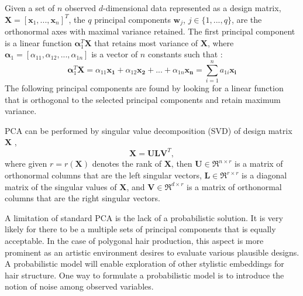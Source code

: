 \documentclass[ %
author={Dillon Keith Diep},
supervisor={Dr. Carl Henrik Ek},
degree={MEng},
title={ART-CG:},
subtitle={Assisted Real-time Content Generation of 3D Hair by Learning Manifolds},
type={Research},
year={2017} ]{dissertation}
\begin{document}
Given a set of $n$ observed $d$-dimensional data represented as a design matrix, $\bm{X}=[\bm{x}_1,...,\bm{x}_n]^T$, the $q$ principal components $\bm{w}_j$, $j \in \{1,...,q\}$, are the orthonormal axes with maximal variance retained. The first principal component is a linear function $\bm{\alpha}^T_1\bm{X}$ that retains most variance of $\bm{X}$, where $\bm{\alpha}_1 = [\alpha_{11}, \alpha_{12}, ..., \alpha_{1n}]$ is a vector of $n$ constants such that \cite[p.4]{pca2002}:
$$\bm{\alpha}^T_1\bm{X}=\alpha_{11}\bm{x_1}+\alpha_{12}\bm{x_2}+...+\alpha_{1n}\bm{x_n} = \sum^n_{i=1}a_{1i}\bm{x_i}$$
The following principal components are found by looking for a linear function that is orthogonal to the selected principal components and retain maximum variance.

PCA can be performed by singular value decomposition (SVD) of design matrix $\bm{X}$ \cite[pp.44-46]{pca2002},
$$\bm{X=ULV}^T,$$
where given $r = r(\bm{X})$ denotes the rank of $\bm{X}$, then
$\bm{U} \in \Re^{n \times r}$ is a matrix of orthonormal columns that are the left singular vectors,
$\bm{L} \in \Re^{r \times r}$ is a diagonal matrix of the singular values of $\bm{X}$, and
$\bm{V} \in \Re^{d \times r}$ is a matrix of orthonormal columns that are the right singular vectors.

A limitation of standard PCA is the lack of a probabilistic solution. 
It is very likely for there to be a multiple sets of principal components that is equally acceptable. In the case of polygonal hair production, this aspect is more prominent as an artistic environment desires to evaluate various plausible designs. A probabilistic model will enable exploration of other stylistic embeddings for hair structure. One way to formulate a probabilistic model is to introduce the notion of noise among observed variables.
\end{document}
